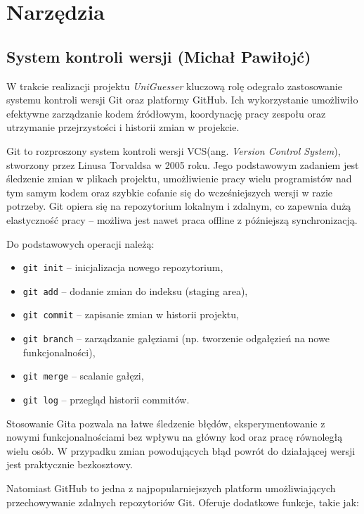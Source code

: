 \chapter{Narzędzia}
\label{chap:tools}

\section{System kontroli wersji (Michał Pawiłojć)}

W trakcie realizacji projektu \textit{UniGuesser} kluczową rolę odegrało zastosowanie systemu kontroli wersji Git oraz platformy GitHub. Ich wykorzystanie umożliwiło efektywne zarządzanie kodem źródłowym, koordynację pracy zespołu oraz utrzymanie przejrzystości i historii zmian w projekcie.

Git to rozproszony system kontroli wersji VCS(ang. \textit{Version Control System}), stworzony przez Linusa Torvaldsa w 2005 roku. Jego podstawowym zadaniem jest śledzenie zmian w plikach projektu, umożliwienie pracy wielu programistów nad tym samym kodem oraz szybkie cofanie się do wcześniejszych wersji w razie potrzeby. Git opiera się na repozytorium lokalnym i zdalnym, co zapewnia dużą elastyczność pracy – możliwa jest nawet praca offline z późniejszą synchronizacją.

Do podstawowych operacji należą:

\begin{itemize}
    \item \texttt{git init} – inicjalizacja nowego repozytorium,
    \item \texttt{git add} – dodanie zmian do indeksu (staging area),
    \item \texttt{git commit} – zapisanie zmian w historii projektu,
    \item \texttt{git branch} – zarządzanie gałęziami (np. tworzenie odgałęzień na nowe funkcjonalności),
    \item \texttt{git merge} – scalanie gałęzi,
    \item \texttt{git log} – przegląd historii commitów.
\end{itemize}

Stosowanie Gita pozwala na łatwe śledzenie błędów, eksperymentowanie z nowymi funkcjonalnościami bez wpływu na główny kod oraz pracę równoległą wielu osób. W przypadku zmian powodujących błąd powrót do działającej wersji jest praktycznie bezkosztowy.

Natomiast GitHub to jedna z najpopularniejszych platform umożliwiających przechowywanie zdalnych repozytoriów Git. Oferuje dodatkowe funkcje, takie jak:

